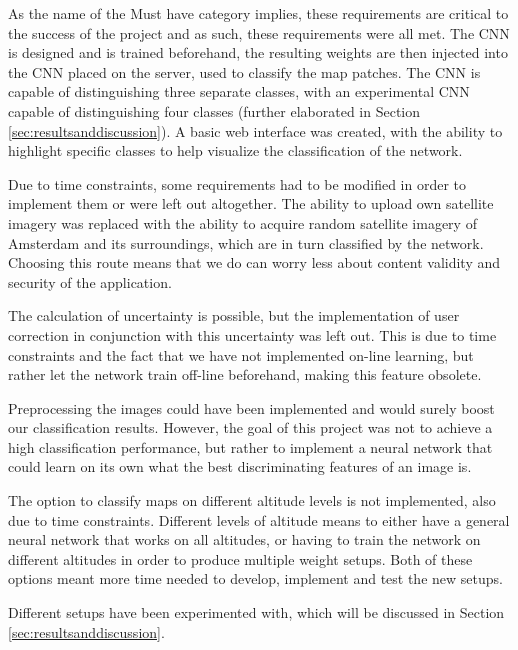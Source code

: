 \documentclass[a4paper,onecolumn]{report}
\begin{document}
As the name of the Must have category implies, these requirements are critical to the success of the project and as such, these requirements were all met. The CNN is designed and is trained beforehand, the resulting weights are then injected into the CNN placed on the server, used to classify the map patches. The CNN is capable of distinguishing three separate classes, with an experimental CNN capable of distinguishing four classes (further elaborated in Section \ref{sec:resultsanddiscussion}).
A basic web interface was created, with the ability to highlight specific classes to help visualize the classification of the network.

Due to time constraints, some requirements had to be modified in order to implement them or were left out altogether. The ability to upload own satellite imagery was replaced with the ability to acquire random satellite imagery of Amsterdam and its surroundings, which are in turn classified by the network. Choosing this route means that we do can worry less about content validity and security of the application.

The calculation of uncertainty is possible, but the implementation of user correction in conjunction with this uncertainty was left out. This is due to time constraints and the fact that we have not implemented on-line learning, but rather let the network train off-line beforehand, making this feature obsolete.

Preprocessing the images could have been implemented and would surely boost our classification results. However, the goal of this project was not to achieve a high classification performance, but rather to implement a neural network that could learn on its own what the best discriminating features of an image is.

The option to classify maps on different altitude levels is not implemented, also due to time constraints. Different levels of altitude means to either have a general neural network that works on all altitudes, or having to train the network on different altitudes in order to produce multiple weight setups. Both of these options meant more time needed to develop, implement and test the new setups. 

Different setups have been experimented with, which will be discussed in Section \ref{sec:resultsanddiscussion}.
\end{document}
